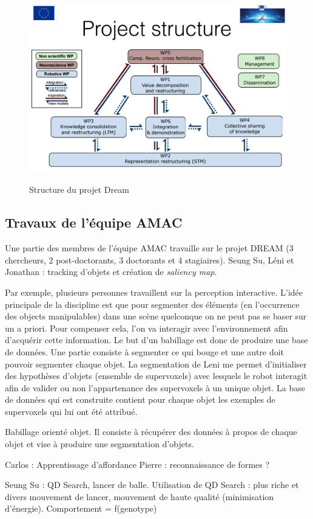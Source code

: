 \documentclass[draft]{llncs}
\begin{document}
\begin{figure}
	\centering
	\includegraphics[width=.7\textwidth]{figures/project_structure.png}
	\label{fig:dream}
	\caption{Structure du projet Dream}
\end{figure}

\subsection{Travaux de l'équipe AMAC}

Une partie des membres de l'équipe AMAC travaille sur le projet DREAM (3 chercheurs, 2 post-doctorants, 3 doctorants et 4 stagiaires).
Seung Su, Léni et Jonathan : tracking d'objets et création de \textit{saliency map}.

Par exemple, plusieurs personnes travaillent sur la perception interactive.
L'idée principale de la discipline est que pour segmenter des éléments (en l'occurrence des objects manipulables) dans une scène quelconque on ne peut pas se baser sur un a priori.
Pour compenser cela, l'on va interagir avec l'environnement afin d'acquérir cette information.
Le but d'un babillage est donc de produire une base de données.
Une partie consiste à segmenter ce qui bouge et une autre doit pouvoir segmenter chaque objet.
La segmentation de Leni me permet d'initialiser des hypothèses d'objets (ensemble de supervoxels) avec lesquels le robot interagit afin de valider ou non l'appartenance des supervoxels à un unique objet.
La base de données qui est construite contient pour chaque objet les exemples de supervoxels qui lui ont été attribué.

Babillage orienté objet. Il consiste à récupérer des données à propos de chaque objet et vise à produire une segmentation d'objets.

Carlos : Apprentissage d'affordance
Pierre : reconnaissance de formes ?

Seung Su : QD Search, lancer de balle. Utilisation de QD Search : plus riche et divers mouvement de lancer, mouvement de haute qualité (minimisation d'énergie).
Comportement = f(genotype)
\end{document}
